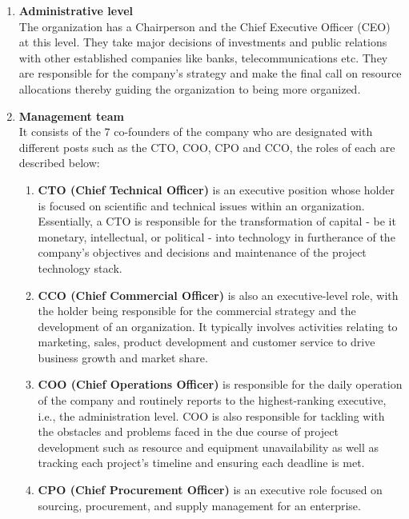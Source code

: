 \documentclass[12pt,a4paper]{scrreprt}
\begin{document}
        \begin{enumerate}
            \item \textbf{Administrative level} \\
            The organization has a Chairperson and the Chief Executive Officer (CEO) at this level. They take major decisions of investments and public relations with other established companies like banks, telecommunications etc. They are responsible for the company's strategy and make the final call on resource allocations thereby guiding the organization to being more organized.

            \item \textbf{Management team} \\
            It consists of the 7 co-founders of the company who are designated with different posts such as the CTO, COO, CPO and CCO, the roles of each are described below:

            \begin{enumerate}
            \item \textbf{CTO (Chief Technical Officer)} is an executive position whose holder is focused on scientific and technical issues within an organization. Essentially, a CTO is responsible for the transformation of capital - be it monetary, intellectual, or political - into technology in furtherance of the company's objectives and decisions and maintenance of the project technology stack.

            \item \textbf{CCO (Chief Commercial Officer)} is also an executive-level role, with the holder being responsible for the commercial strategy and the development of an organization. It typically involves activities relating to marketing, sales, product development and customer service to drive business growth and market share.

            \item \textbf{COO (Chief Operations Officer)} is responsible for the daily operation of the company and routinely reports to the highest-ranking executive, i.e., the administration level. COO is also responsible for tackling with the obstacles and problems faced in the due course of project development such as resource and equipment unavailability as well as tracking each project's timeline and ensuring each deadline is met.

            \item \textbf{CPO (Chief Procurement Officer)} is an executive role focused on sourcing, procurement, and supply management for an enterprise.
            \end{enumerate}


\end{enumerate}
\end{document}
